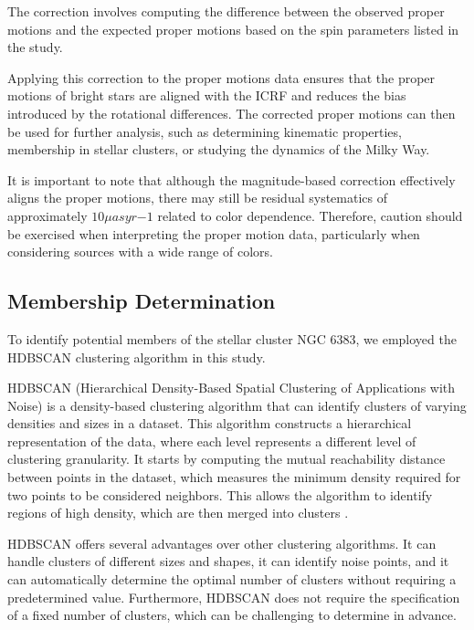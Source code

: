 \documentclass[fleqn,usenatbib,usedcolumn,useAMS]{mnras}
\begin{document}
The correction involves computing the difference between the observed proper motions and the expected proper motions based on the spin parameters listed in the study.

Applying this correction to the proper motions data ensures that the proper motions of bright stars are aligned with the ICRF and reduces the bias introduced by the rotational differences. The corrected proper motions can then be used for further analysis, such as determining kinematic properties, membership in stellar clusters, or studying the dynamics of the Milky Way.

It is important to note that although the magnitude-based correction effectively aligns the proper motions, there may still be residual systematics of approximately $10 \mu as yr{-1}$ related to color dependence. Therefore, caution should be exercised when interpreting the proper motion data, particularly when considering sources with a wide range of colors.

\subsection{Membership Determination}\label{Membership Determination}

To identify potential members of the stellar cluster NGC 6383, we employed the HDBSCAN clustering algorithm in this study.

HDBSCAN (Hierarchical Density-Based Spatial Clustering of Applications with Noise) is a density-based clustering algorithm that can identify clusters of varying densities and sizes in a dataset. This algorithm constructs a hierarchical representation of the data, where each level represents a different level of clustering granularity. It starts by computing the mutual reachability distance between points in the dataset, which measures the minimum density required for two points to be considered neighbors. This allows the algorithm to identify regions of high density, which are then merged into clusters \citep{McInnes2017}.

HDBSCAN offers several advantages over other clustering algorithms. It can handle clusters of different sizes and shapes, it can identify noise points, and it can automatically determine the optimal number of clusters without requiring a predetermined value. Furthermore, HDBSCAN does not require the specification of a fixed number of clusters, which can be challenging to determine in advance.
\end{document}
